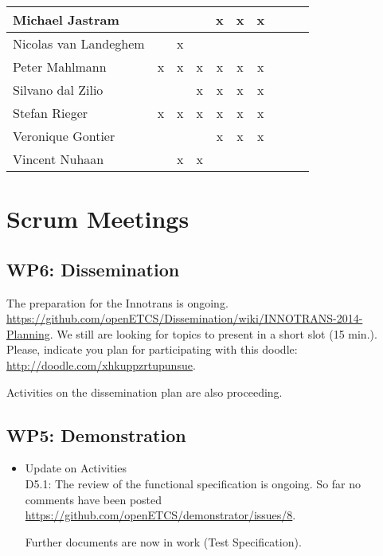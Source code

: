 \documentclass[a4paper, 11pt]{article}
\begin{document}
\begin{tabular}{|l|c|c|c|c|c|c||c|c|c|}
Michael Jastram      &   &   &   & x & x & x \\\hline
Nicolas van Landeghem&   & x &   &   &   &   \\\hline
Peter Mahlmann       & x & x & x & x & x & x \\\hline
Silvano dal Zilio    &   &   & x & x & x & x \\\hline
Stefan Rieger        & x & x & x & x & x & x \\\hline
Veronique Gontier    &   &   &   & x & x & x \\\hline
Vincent Nuhaan       &   & x & x &   &   &   \\\hline
\end{tabular}


\section{Scrum Meetings}

\subsection{WP6: Dissemination}

The preparation for the Innotrans is ongoing. \url{
https://github.com/openETCS/Dissemination/wiki/INNOTRANS-2014-Planning}. We still are looking for topics to present in a short slot (15 min.). Please, indicate you plan for participating with this doodle: \url{http://doodle.com/xhkuppzrtupunsue}.

Activities on the dissemination plan are also proceeding.

\subsection{WP5: Demonstration}
\begin{itemize}
\item Update on Activities\\

D5.1: The review of the functional specification is ongoing. So far no comments have been posted \url{https://github.com/openETCS/demonstrator/issues/8}.

Further documents are now in work (Test Specification).

\end{itemize}
\end{document}

